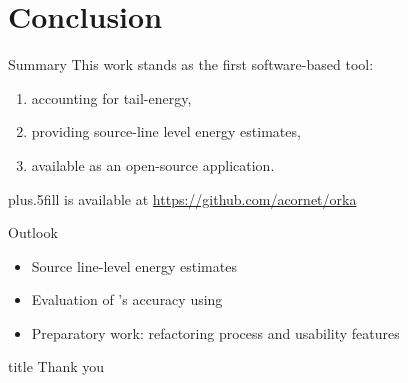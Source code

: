 \section{Conclusion}
\begin{frame}{Summary}
This work stands as the first software-based tool:
\begin{enumerate}
\item accounting for \alert{tail-energy},
\item providing \alert{source-line level} energy estimates,
\item available as an \alert{open-source} application.
\end{enumerate}
\vskip0pt plus.5fill
{\small \orka{} is available at \url{https://github.com/acornet/orka}}
\end{frame}
%
%
\begin{frame}{Outlook}
\begin{itemize}
\item Source line-level energy estimates
\item Evaluation of \orka{}'s accuracy using \petra{}
\item Preparatory work: refactoring process and usability features
\end{itemize}
\end{frame}
%
%
\begin{frame}
  \vfill
  \centering
  \begin{beamercolorbox}[sep=8pt,center,shadow=true,rounded=true]{title}
    Thank you\par%
  \end{beamercolorbox}
  \vfill
\end{frame}

